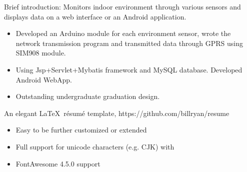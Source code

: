 \documentclass{resume}
\begin{document}
Brief introduction: Monitors indoor environment through various sensors and displays data on a web interface or an Android application.
\begin{itemize}
  \item Developed an Arduino module for each environment sensor, wrote the network transmission program and transmitted data through GPRS using SIM908 module.
  \item Using Jsp+Servlet+Mybatis framework and MySQL database. Developed Android WebApp.
  \item Outstanding undergraduate graduation design.
\end{itemize}

An elegant \LaTeX\ résumé template, https://github.com/billryan/resume
\begin{itemize}
  \item Easy to be further customized or extended
  \item Full support for unicode characters (e.g. CJK) with \XeLaTeX\
  \item FontAwesome 4.5.0 support
\end{itemize}


%
%
\end{document}
